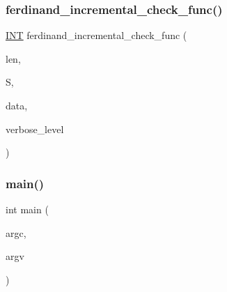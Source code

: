 \subsubsection{\texorpdfstring{ferdinand\+\_\+incremental\+\_\+check\+\_\+func()}{ferdinand\_incremental\_check\_func()}}
{\footnotesize\ttfamily \mbox{\hyperlink{galois_8h_a09fddde158a3a20bd2dcadb609de11dc}{I\+NT}} ferdinand\+\_\+incremental\+\_\+check\+\_\+func (\begin{DoxyParamCaption}\item[{\mbox{\hyperlink{galois_8h_a09fddde158a3a20bd2dcadb609de11dc}{I\+NT}}}]{len,  }\item[{\mbox{\hyperlink{galois_8h_a09fddde158a3a20bd2dcadb609de11dc}{I\+NT}} $\ast$}]{S,  }\item[{void $\ast$}]{data,  }\item[{\mbox{\hyperlink{galois_8h_a09fddde158a3a20bd2dcadb609de11dc}{I\+NT}}}]{verbose\+\_\+level }\end{DoxyParamCaption})}

\mbox{\label{ferdinand_8_c_a3c04138a5bfe5d72780bb7e82a18e627}} 
\subsubsection{\texorpdfstring{main()}{main()}}
{\footnotesize\ttfamily int main (\begin{DoxyParamCaption}\item[{int}]{argc,  }\item[{char $\ast$$\ast$}]{argv }\end{DoxyParamCaption})}

